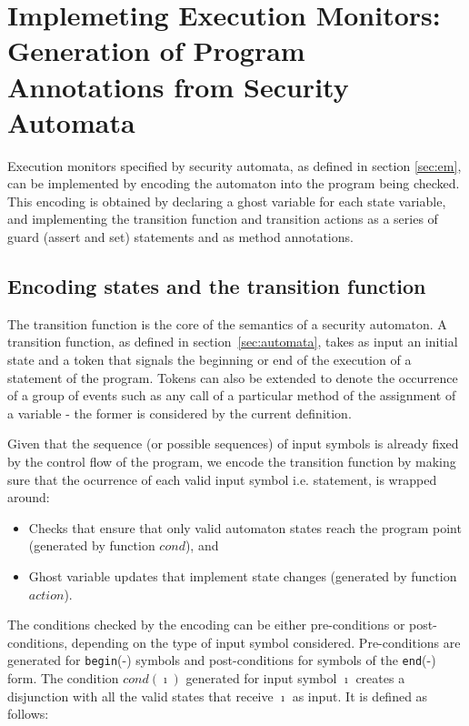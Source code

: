 \documentclass[10pt,notitlepage,twoside]{article}
\begin{document}
\section{Implemeting Execution Monitors: Generation of Program Annotations from Security Automata}

Execution monitors specified by security automata, as defined in section \ref{sec:em}, can be implemented by encoding the automaton into the program being checked.
This encoding is obtained by declaring a ghost variable for each state variable, and implementing the transition function and transition actions as a series of guard (assert and set) statements and as method annotations.


\subsection{Encoding states and the transition function}

The transition function is the core of the semantics of a security automaton.
A transition function, as  defined in section~\ref{sec:automata}, takes as input an initial state and a token that signals the beginning or end of the execution of a  statement of the program. Tokens can also be extended to denote the occurrence of a group of events such as any call of a particular method of the assignment of a variable - the former is considered by the current definition.


Given that the sequence (or possible sequences)  of input symbols is already fixed by the control flow of the program, we encode the transition function by making sure that the ocurrence of each valid input symbol i.e. statement, is wrapped around:
\begin{itemize}
\item Checks that ensure that only valid automaton states reach the program point (generated by function $\mathit{cond}$), and
\item Ghost variable updates that implement state changes (generated by function $\mathit{action}$). 
\end{itemize}

The conditions checked by the encoding can be either pre-conditions or post-conditions, depending on the type of input symbol considered. Pre-conditions are generated for \texttt{begin}(-) symbols and post-conditions for symbols of the \texttt{end}(-) form.
The condition $\mathit{cond}(\imath)$ generated for input symbol $\imath$ creates a disjunction with all the valid states that receive $\imath$ as input. It  is defined as follows:
\end{document}
